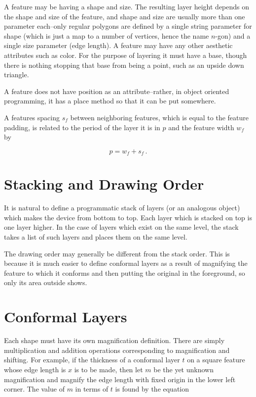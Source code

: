 \documentclass{article}
\begin{document}
A feature may be having a shape and size. The resulting layer height depends on the shape and size of the feature, and shape and size are usually more than one parameter each--only regular polygons are defined by a single string parameter for shape (which is just a map to a number of vertices, hence the name $n$-gon) and a single size parameter (edge length). A feature may have any other aesthetic attributes such as color. For the purpose of layering it must have a base, though there is nothing stopping that base from being a point, such as an upside down triangle.

A feature does not have position as an attribute--rather, in object oriented programming, it has a place method so that it can be put somewhere.

A features spacing $s_f$ between neighboring features, which is equal to the feature padding, is related to the period of the layer it is in $p$ and the feature width $w_f$ by

$$p = w_f + s_f \,.$$

\section{Stacking and Drawing Order}
It is natural to define a programmatic stack of layers (or an analogous object) which makes the device from bottom to top. Each layer which is stacked on top is one layer higher. In the case of layers which exist on the same level, the stack takes a list of such layers and places them on the same level.

The drawing order may generally be different from the stack order. This is because it is much easier to define conformal layers as a result of magnifying the feature to which it conforms and then putting the original in the foreground, so only its area outside shows.

\section{Conformal Layers}
Each shape must have its own magnification definition. There are simply multiplication and addition operations corresponding to magnification and shifting. For example, if the thickness of a conformal layer $t$ on a square feature whose edge length is $x$ is to be made, then let $m$ be the yet unknown magnification and magnify the edge length with fixed origin in the lower left corner. The value of $m$ in terms of $t$ is found by the equation
\end{document}

